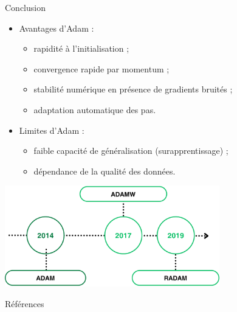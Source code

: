 \documentclass{beamer}
\begin{document}
\begin{frame}{Conclusion}

  \begin{itemize}
    \item Avantages d’Adam : 
    \begin{itemize}
      \item rapidité à l'initialisation ;
      \item convergence rapide par momentum ;
      \item stabilité numérique en présence de gradients bruités ;
      \item adaptation automatique des pas.
    \end{itemize}
    \item Limites d’Adam : 
    \begin{itemize}
      \item faible capacité de généralisation (surapprentissage) ;
      \item dépendance de la qualité des données.
    \end{itemize}
  \end{itemize}

  \begin{center}
    \includegraphics[width=0.7\textwidth]{frise3.png}
  \end{center}

\end{frame}

\begin{frame}{Références}
  \renewcommand*{\bibfont}{\small}
  \printbibliography[heading=none]
\end{frame}
\end{document}
